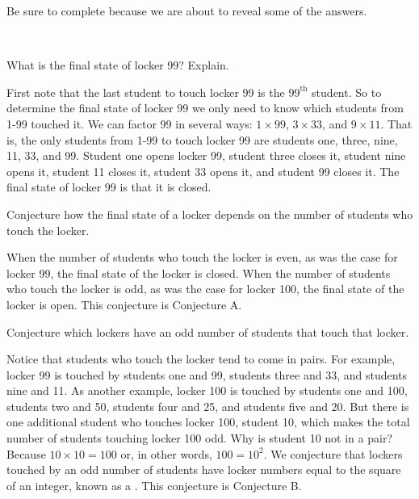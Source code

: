 Be sure to complete  because we are about to reveal some of the answers.

\begin{exam}
\label{exam_open_lockers}
~
    \begin{apart}
        \item What is the final state of locker 99?  Explain.
            \begin{soln}
                First note that the last student to touch locker 99 is the $99^{\text{th}}$ student.  So to determine the final state of locker 99 we only need to know which students from 1-99 touched it. We can factor 99 in several ways: $1 \times 99$, $3 \times 33$, and $9 \times 11$.  That is, the only students from 1-99 to touch locker 99 are students one, three, nine, 11, 33, and 99.  Student one opens locker 99, student three closes it, student nine opens it, student 11 closes it, student 33 opens it, and student 99 closes it.  The final state of locker 99 is that it is closed.
            \end{soln}
        \item Conjecture how the final state of a locker depends on the number of students who touch the locker.
            \begin{soln}
                When the number of students who touch the locker is even, as was the case for locker 99, the final state of the locker is closed.  When the number of students who touch the locker is odd, as was the case for locker 100, the final state of the locker is open.  This conjecture is Conjecture A.
            \end{soln}
        \item Conjecture which lockers have an odd number of students that touch that locker.
            \begin{soln}
                Notice that students who touch the locker tend to come in pairs.  For example, locker 99 is touched by students one and 99, students three and 33, and students nine and 11.  As another example, locker 100 is touched by students one and 100, students two and 50, students four and 25, and students five and 20.  But there is one additional student who touches locker 100, student 10, which makes the total number of students touching locker 100 odd.  Why is student 10 not in a pair?  Because $10 \times 10 = 100$ or, in other words, $100 = 10^2$.  We conjecture that lockers touched by an odd number of students have locker numbers equal to the square of an integer, known as a . This conjecture is Conjecture B.
            \end{soln}
    \end{apart}
\end{exam}

